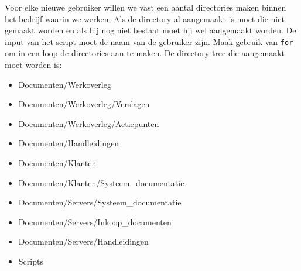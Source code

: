 Voor elke nieuwe gebruiker willen we vast een aantal directories maken binnen het bedrijf waarin we werken. Als de directory al aangemaakt is moet die niet gemaakt worden en als hij nog niet bestaat moet hij wel aangemaakt worden. De input van het script moet de naam van de gebruiker zijn. Maak gebruik van \texttt{for} om in een loop de directories aan te maken. De directory-tree die aangemaakt moet worden is:
\begin{itemize}
\item Documenten/Werkoverleg
\item Documenten/Werkoverleg/Verslagen
\item Documenten/Werkoverleg/Actiepunten
\item Documenten/Handleidingen
\item Documenten/Klanten
\item Documenten/Klanten/Systeem\_documentatie
\item Documenten/Servers/Systeem\_documentatie
\item Documenten/Servers/Inkoop\_documenten
\item Documenten/Servers/Handleidingen
\item Scripts
\end{itemize}
